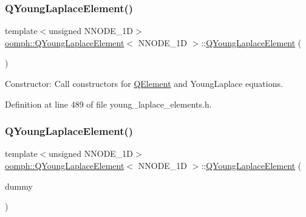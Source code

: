 \subsubsection{\texorpdfstring{Q\+Young\+Laplace\+Element()}{QYoungLaplaceElement()}\hspace{0.1cm}{\footnotesize\ttfamily [1/2]}}
{\footnotesize\ttfamily template$<$unsigned N\+N\+O\+D\+E\+\_\+1D$>$ \\
\hyperlink{classoomph_1_1QYoungLaplaceElement}{oomph\+::\+Q\+Young\+Laplace\+Element}$<$ N\+N\+O\+D\+E\+\_\+1D $>$\+::\hyperlink{classoomph_1_1QYoungLaplaceElement}{Q\+Young\+Laplace\+Element} (\begin{DoxyParamCaption}{ }\end{DoxyParamCaption})\hspace{0.3cm}{\ttfamily [inline]}}



Constructor\+: Call constructors for \hyperlink{classoomph_1_1QElement}{Q\+Element} and Young\+Laplace equations. 



Definition at line 489 of file young\+\_\+laplace\+\_\+elements.\+h.

\mbox{\label{classoomph_1_1QYoungLaplaceElement_a489e0095ed071e89f6e12ad4f76502e8}} 
\subsubsection{\texorpdfstring{Q\+Young\+Laplace\+Element()}{QYoungLaplaceElement()}\hspace{0.1cm}{\footnotesize\ttfamily [2/2]}}
{\footnotesize\ttfamily template$<$unsigned N\+N\+O\+D\+E\+\_\+1D$>$ \\
\hyperlink{classoomph_1_1QYoungLaplaceElement}{oomph\+::\+Q\+Young\+Laplace\+Element}$<$ N\+N\+O\+D\+E\+\_\+1D $>$\+::\hyperlink{classoomph_1_1QYoungLaplaceElement}{Q\+Young\+Laplace\+Element} (\begin{DoxyParamCaption}\item[{const \hyperlink{classoomph_1_1QYoungLaplaceElement}{Q\+Young\+Laplace\+Element}$<$ N\+N\+O\+D\+E\+\_\+1D $>$ \&}]{dummy }\end{DoxyParamCaption})\hspace{0.3cm}{\ttfamily [inline]}}



